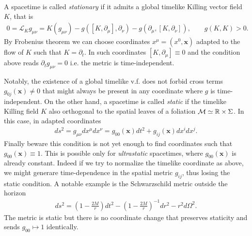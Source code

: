\documentclass[../QFT_main.tex]{subfiles}
\begin{document}
\begin{mytheorem}
%
A spacetime is called \emph{stationary} if it admits a global timelike Killing vector field $K$, that is
{\small\begin{align}
    0=\mathcal{L}_K g_{\mu\nu} =K(g_{\mu\nu})-g([K,\partial_\mu],\partial_\nu)-g(\partial_\mu,[K,\partial_\nu]), \qquad g(K,K)>0.
\end{align}}
By Frobenius theorem we can choose coordinates $x^\mu=(x^0,\mathbf{x})$ adapted to the flow of $K$ such that $K=\partial_t$.
In such coordinates $[K,\partial_\mu]\equiv0$ and the condition above reads $\partial_t g_{\mu\nu}=0$ i.e. the metric is time-independent.

Notably, the existence of a global timelike v.f. does not forbid cross terms $g_{0j}(\mathbf{x})\neq0$ that might always be present in any coordinate where $g$ is time-independent.
On the other hand, a spacetime is called \emph{static} if the timelike Killing field $K$  also orthogonal to the spatial leaves of a foliation $\mathcal{M}\simeq \mathbb{R}\times \Sigma$.
In this case, in adapted coordinates 
\begin{align}
    ds^2 = g_{\mu\nu} dx^\mu dx^\nu = g_{00}(\mathbf{x}) dt^2 + g_{ij}(\mathbf{x}) dx^i dx^j.
\end{align}
Finally beware this condition is not yet enough to find coordinates such that $g_{00}(\mathbf{x})\equiv1$.
This is possible only for \emph{ultrastatic} spacetimes, where $g_{00}(\mathbf{x})$ is already constant.
Indeed if we try to normalize the timelike coordinate as above, we might generare time-dependence in the spatial metric $g_{ij}$, thus losing the static condition.
A notable example is the Schwarzschild metric outside the horizon
{\small\begin{align}
    ds^2 = \left(1-\frac{2M}{r}\right) dt^2 - \left(1-\frac{2M}{r}\right)^{-1} dr^2 - r^2 d\Omega^2.
\end{align}}
The metric is static but there is no coordinate change that preserves staticity and sends $g_{00}\mapsto 1$ identically.


\end{mytheorem}
\end{document}
